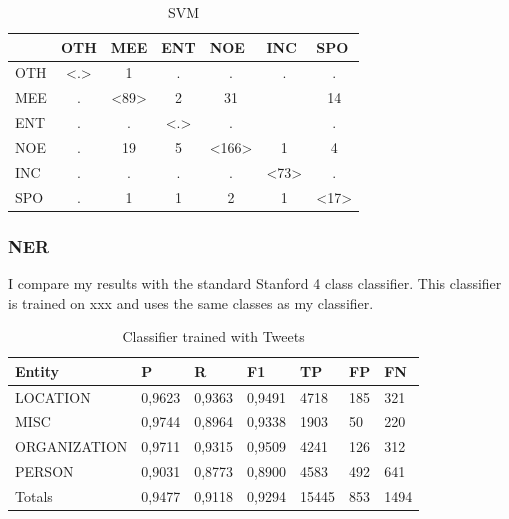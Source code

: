 \documentclass[
10pt, %
a4paper, %
oneside, %
headinclude,footinclude, %
BCOR5mm, %
]{scrartcl}
\begin{document}
\begin{table}[h]
\begin{tabular}{|l|c|c|c|c|c|c|}
\hline
    & \multicolumn{1}{l|}{OTH} & \multicolumn{1}{l|}{MEE} & \multicolumn{1}{l|}{ENT} & \multicolumn{1}{l|}{NOE} & \multicolumn{1}{l|}{INC} & \multicolumn{1}{l|}{SPO} \\ \hline
OTH & \textless.\textgreater   & 1                        & .                        & .                        & .                        & .                        \\ \hline
MEE & .                        & \textless89\textgreater  & 2                        & 31                       &                          & 14                       \\ \hline
ENT & .                        & .                        & \textless.\textgreater   & .                        &                          & .                        \\ \hline
NOE & .                        & 19                       & 5                        & \textless166\textgreater & 1                        & 4                        \\ \hline
INC & .                        & .                        & .                        & .                        & \textless73\textgreater  & .                        \\ \hline
SPO & .                        & 1                        & 1                        & 2                        & 1                        & \textless17\textgreater  \\ \hline
\end{tabular}
\caption[Table caption text]{SVM }
\end{table}




\subsubsection{NER}
I compare my results with the standard Stanford 4 class classifier. This classifier is trained on xxx and uses the same classes as my classifier.

\begin{table}[h]
\begin{tabular}{|l|l|l|l|l|l|l|}
\hline
Entity       & P      & R      & F1     & TP    & FP  & FN   \\ \hline
LOCATION     & 0,9623 & 0,9363 & 0,9491 & 4718  & 185 & 321  \\ \hline
MISC         & 0,9744 & 0,8964 & 0,9338 & 1903  & 50  & 220  \\ \hline
ORGANIZATION & 0,9711 & 0,9315 & 0,9509 & 4241  & 126 & 312  \\ \hline
PERSON       & 0,9031 & 0,8773 & 0,8900 & 4583  & 492 & 641  \\ \hline
Totals       & 0,9477 & 0,9118 & 0,9294 & 15445 & 853 & 1494 \\ \hline
\end{tabular}
\caption[Table caption text]{Classifier trained with Tweets }
\end{table}
\end{document}

